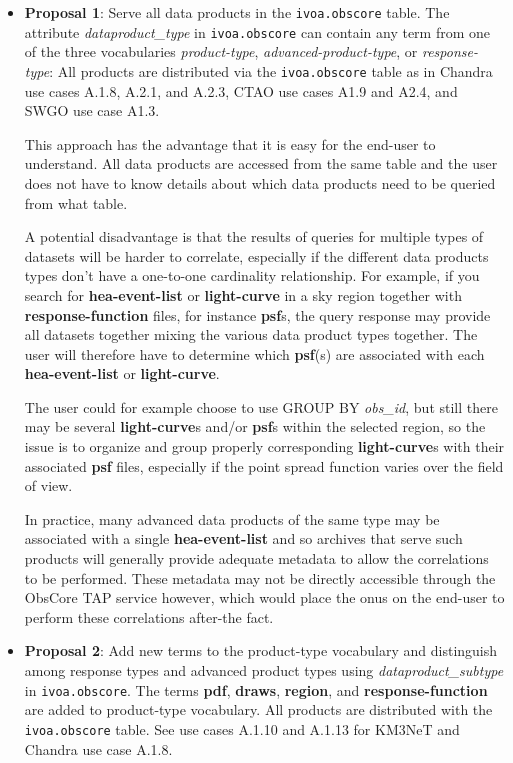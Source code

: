 \begin{itemize}
\item {\bf Proposal 1}: Serve all data products in the {\tt ivoa.obscore} table.  The attribute {\em dataproduct\_type\/} in {\tt ivoa.obscore} can contain any term from one of the three vocabularies  \textsl{product-type}, \textsl{advanced-product-type},  or \textsl{response-type}:
All products are distributed via the {\tt ivoa.obs\-core} table as in
Chandra use cases A.1.8, A.2.1, and A.2.3, CTAO use cases A1.9 and A2.4, and SWGO use case A1.3.

This approach has the advantage that it is easy for the end-user to understand.  All data products are accessed from the same table and the user does not have to know details about which data products need to be queried from what table.

A potential disadvantage is that the results of queries for multiple types of datasets will be harder to correlate, especially if the different data products types don't have a one-to-one cardinality relationship.  For example, if you search for  {\bf hea-event-list} or {\bf light-curve} in a sky region together with {\bf response-function} files, for instance {\bf psf}s, the query response may provide all datasets together mixing the various data product types together.  The user will therefore have to determine which {\bf psf}(s) are associated with each {\bf hea-event-list} or {\bf light-curve}.

The user could for example choose to use GROUP BY {\em obs\_id\/}, but still there may be several {\bf light-curve}s and/or {\bf psf}s within the selected region, so the issue is to organize and group properly corresponding {\bf light-curve}s with their associated {\bf psf} files, especially if the point spread function varies over the field of view.

In practice, many advanced data products of the same type may be associated with a single {\bf hea-event-list} and so archives that serve such products will generally provide adequate metadata to allow the correlations to be performed.  These metadata may not be directly accessible through the ObsCore TAP service however, which would place the onus on the end-user to perform these correlations after-the fact.

\item {\bf Proposal 2}: Add new terms to the product-type vocabulary and distinguish among response types and advanced product types using {\em data\-product\_subtype\/} in {\tt ivoa.obscore}.
The terms {\bf pdf}, {\bf draws}, {\bf region}, and {\bf response-function} are added to product-type vocabulary.
All products are distributed with the {\tt ivoa.obscore} table.
See use cases A.1.10 and A.1.13 for KM3NeT and Chandra use case A.1.8.


\end{itemize}
